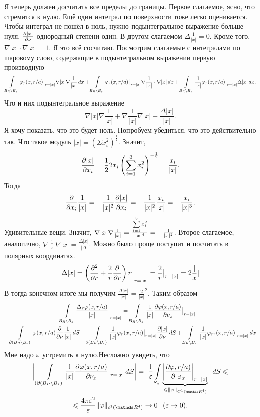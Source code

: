 Я теперь должен досчитать все пределы до границы. Первое слагаемое, ясно, что стремится к нулю. Ещё один интеграл по поверхности тоже легко оценивается. Чтобы интеграл не пошёл в ноль, нужно подынтегральное выражение больше нуля. $\frac{\partial |x|}{\partial \nu}$ однородный степени один. В другом слагаемом $\Delta\frac1{|x|} = 0$. Кроме того, $\nabla|x|\cdot\nabla|x| = 1$. Я это всё сосчитаю. Посмотрим слагаемые с интегралами по шаровому слою, содержащие в подынтегральном выражении первую производную
\[
  \int\limits_{B_R\setminus B_\varepsilon}\varphi_r(x,r/a)\big|_{r=|x|}\nabla|x|\nabla\frac1{|x|}\,dx + 
  \int\limits_{B_R\setminus B_\varepsilon}\varphi_r(x,r/a)\big|_{r=|x|}\nabla\frac1{|x|}\cdot\nabla|x|\,dx +
   \int\limits_{B_R\setminus B_\varepsilon}\frac1{|x|}\varphi_r(x,r/a)\big|_{r=|x|}\Delta|x|\,dx.
\]
Что и них подынтегральное выражение
\[
  \nabla|x|\nabla\frac1{|x|} + \nabla\frac1{|x|}\nabla|x| + \frac{\Delta|x|}{|x|}.
\]
Я хочу показать, что это будет ноль. Попробуем убедиться, что это действительно так. Что такое модуль $|x| = (\Sigma x_i^2)^{\frac12}$. Значит,
\[
  \frac{\partial |x|}{\partial x_i} = \frac12 2 x_i\left(\sum\limits_{i = 1}^{3}x_i^2\right)^{-\frac12} = \frac{x_i}{|x|}.
\]
Тогда
\[
  \frac{\partial }{\partial x_i}\frac1{|x|} = -\frac1{|x|^2}\frac{\partial |x|}{\partial x_i} = -\frac1{|x|^2}\frac{x_i}{|x|}= -\frac{x_i}{|x|^3}.
\]
Удивительные вещи. Значит, $\nabla|x|\nabla\frac1{|x|} = \frac{\sum\limits_{i = 1}^{3}x_i^2}{|x|^4} = -\frac1{|x|^2}$. Второе слагаемое, аналогично, $\nabla\frac1{|x|}\nabla|x| = \frac{\Delta |x|}{|\Delta}$. Можно было проще поступит и посчитать в полярных координатах.
\[
  \Delta|x| = \left(\frac{\partial ^2}{\partial r} + \frac2r\frac{\partial }{\partial r}\right)r\bigg|_{r=|x|} = \frac2r\big|_{r=|x|} = 2\frac |x|
\]
В тогда конечном итоге мы получим $\frac{\Delta|x|}{|x|} = \frac2{|x|}^2$.
 Таким образом
\begin{multline*}
  \int\limits_{B_R\setminus B_\varepsilon}\frac{\Delta_x\varphi(x,r/a)}{|x|}\bigg|_{r=|x|}=
  \int\limits_{B_R\setminus B_\varepsilon}\frac1{|x|}\frac{\partial \varphi(x,r/a)}{\partial \nu_x}\big|_{r=|x|}\,-\\
 - \int\limits_{\partial(B_R\setminus B_\varepsilon)}\varphi(x,r/a)\frac{\partial }{\partial \nu}\frac1{|x|}\,dS -
  \int\limits_{\partial(B_R\setminus B_\varepsilon)}\frac1{|x|}\varphi_r(x,r/a)\big|_{r=|x|}\frac{\partial |x|}{\partial \nu}\,dS + 
  \int\limits_{B_R\setminus B_\varepsilon}\frac1{|x|}\varphi_{rr}(x,r/a)\big|_{r=|x|}\,dx
\end{multline*}
Мне надо $\varepsilon$ устремить к нулю.Несложно увидеть, что
\begin{multline*}
  \bigg|\Gint{(\dl(B_R\dd B_\e)}\frac1{|x|}\CP{\phi(x,r/a)}{\nu_x}\big|_{r=|x|}\,dS\bigg|=
  \bigg|\frac1\e\Gint{S_\e}\underbrace{\left|\CP{\phi,r/a)}{\ni_x}\right|_{r=|x|}}_{\le\|\phi\|_{C^1(\R^4)}}\bigg|\,dS\le\\
  \le \frac{4\pi\e^2}\e\|\phi\|_{c^1(\R^4)}\to 0\pau (\e\to0).
\end{multline*}

